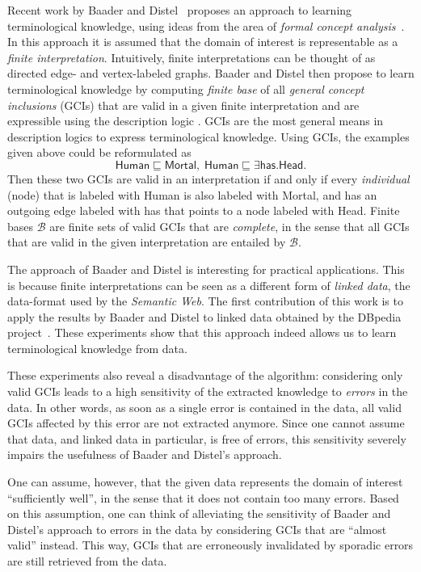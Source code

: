 \documentclass[english,fleqn]{scrartcl}
\begin{document}
Recent work by Baader and Distel~\cite{Diss-Felix} proposes an approach to learning
terminological knowledge, using ideas from the area of \emph{formal concept
  analysis}~\cite{fca-book}.  In this approach it is assumed that the domain of interest
is representable as a \emph{finite interpretation}.  Intuitively, finite interpretations
can be thought of as directed edge- and vertex-labeled graphs.  Baader and Distel then
propose to learn terminological knowledge by computing \emph{finite base} of all
\emph{general concept inclusions} (GCIs) that are valid in a given finite interpretation
and are expressible using the description logic \ELbot.  GCIs are the most general means
in description logics to express terminological knowledge.  Using GCIs, the examples given
above could be reformulated as
\begin{equation*}
  \mathsf{Human} \sqsubseteq \mathsf{Mortal}, \; \mathsf{Human} \sqsubseteq \exists
  \mathsf{has}. \mathsf{Head}.
\end{equation*}
Then these two GCIs are valid in an interpretation if and only if every \emph{individual}
(node) that is labeled with \textsf{Human} is also labeled with \textsf{Mortal}, and has
an outgoing edge labeled with \textsf{has} that points to a node labeled with
\textsf{Head}.  Finite bases $\mathcal{B}$ are finite sets of valid GCIs that are
\emph{complete}, in the sense that all GCIs that are valid in the given interpretation are
entailed by $\mathcal{B}$.

The approach of Baader and Distel is interesting for practical applications.  This is
because finite interpretations can be seen as a different form of \emph{linked data}, the
data-format used by the \emph{Semantic Web}.  The first contribution of this work is to
apply the results by Baader and Distel to linked data obtained by the DBpedia
project~\cite{DBpedia}.  These experiments show that this approach indeed allows us to
learn terminological knowledge from data.

These experiments also reveal a disadvantage of the algorithm: considering only valid GCIs
leads to a high sensitivity of the extracted knowledge to \emph{errors} in the data.  In
other words, as soon as a single error is contained in the data, all valid GCIs affected
by this error are not extracted anymore.  Since one cannot assume that data, and linked
data in particular, is free of errors, this sensitivity severely impairs the usefulness of
Baader and Distel's approach.

One can assume, however, that the given data represents the domain of interest
\enquote{sufficiently well}, in the sense that it does not contain too many errors.  Based
on this assumption, one can think of alleviating the sensitivity of Baader and Distel's
approach to errors in the data by considering GCIs that are \enquote{almost valid}
instead.  This way, GCIs that are erroneously invalidated by sporadic errors are still
retrieved from the data.
\end{document}

